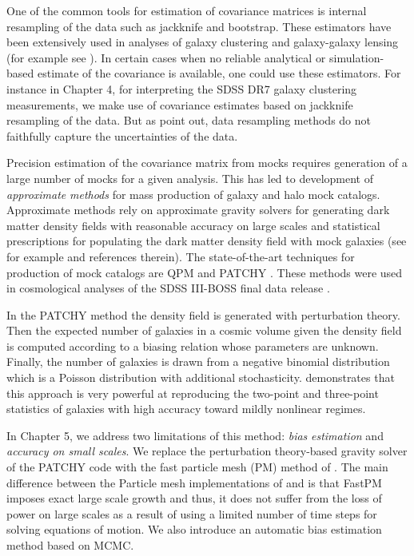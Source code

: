 One of the common tools for estimation of covariance matrices is internal resampling of the data such as jackknife and bootstrap. These estimators have been extensively used in analyses of galaxy clustering and galaxy-galaxy lensing (for example see \citealt{reid2014,hod_vs_sham,shirasaki2016,singh2016,kwan2017}).
In certain cases when no reliable analytical or simulation-based estimate of the covariance is available, one could use these estimators. 
For instance in Chapter 4, for interpreting the SDSS DR7 galaxy clustering measurements, 
we make use of covariance estimates based on jackknife resampling of the data. But as \citet{norberg,fried2016} point out, data resampling methods do not faithfully capture the uncertainties of the data. 

Precision estimation of the covariance matrix from mocks requires generation of a large number of mocks for a given analysis. This has led to development of \emph{approximate} \emph{methods} for mass production of galaxy and halo mock catalogs. Approximate methods rely on approximate gravity solvers for generating dark matter density fields with reasonable accuracy on large scales and statistical prescriptions for populating the dark matter density field with mock galaxies (see for example \citealt{pthalo,qpm,eazymock,kitaura2016} and references 
therein). The state-of-the-art techniques for production of mock catalogs are QPM \citep{qpm} and PATCHY \citep{kitaura2016}. These methods were used in 
cosmological analyses of the SDSS III-BOSS final data release \citep{alam2016}.

In the PATCHY method the density field is generated with perturbation theory. Then the expected number of galaxies in a cosmic volume given the density field is computed according to a biasing relation whose parameters are unknown. 
Finally, the number of galaxies is drawn from a negative binomial distribution which is a Poisson distribution with additional stochasticity. 
\citet{chuang2015} demonstrates that this approach is very powerful at reproducing the two-point and three-point statistics of galaxies with high accuracy toward mildly nonlinear regimes.

In Chapter 5, we address two limitations of this method: \emph{bias} \emph{estimation} and \emph{accuracy on small scales}. We replace the perturbation theory-based 
gravity solver of the PATCHY code with the fast particle mesh (PM) method of \citet{fastpm}. The main difference between the Particle mesh implementations of \citet{fastpm} and \citet{qpm} is that 
FastPM imposes exact large scale growth and thus, it does not suffer from the loss of power on large scales as a result of using a limited number of time steps for solving equations of motion. We also introduce an automatic bias estimation method based on MCMC. 


